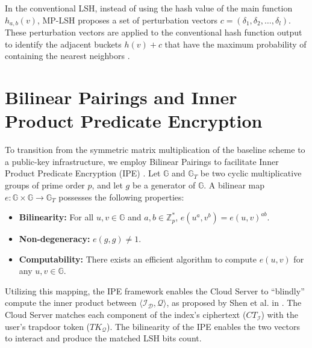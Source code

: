 In the conventional LSH, instead of using the hash value of the main function $h_{a, b}(v)$, MP-LSH proposes a set of perturbation vectors $c = (\delta_1, \delta_2, \dots, \delta_l)$. These perturbation vectors are applied to the conventional hash function output to identify the adjacent buckets $h(v) + c$ that have the maximum probability of containing the nearest neighbors \cite{lv2007multi}.

\section{Bilinear Pairings and Inner Product Predicate Encryption}
To transition from the symmetric matrix multiplication of the baseline scheme to a public-key infrastructure, we employ Bilinear Pairings to facilitate Inner Product Predicate Encryption (IPE) \cite{shen2009predicate}. Let $\mathbb{G}$ and $\mathbb{G}_T$ be two cyclic multiplicative groups of prime order $p$, and let $g$ be a generator of $\mathbb{G}$. A bilinear map $e: \mathbb{G} \times \mathbb{G} \rightarrow \mathbb{G}_T$ possesses the following properties:
\begin{itemize}
    \item \textbf{Bilinearity:} For all $u, v \in \mathbb{G}$ and $a, b \in \mathbb{Z}_p^*$, $e(u^a, v^b) = e(u, v)^{ab}$.
    \item \textbf{Non-degeneracy:} $e(g, g) \neq 1$.
    \item \textbf{Computability:} There exists an efficient algorithm to compute $e(u, v)$ for any $u, v \in \mathbb{G}$.
\end{itemize}

Utilizing this mapping, the IPE framework enables the Cloud Server to “blindly” compute the inner product between $\langle \mathcal{I_D}, \mathcal{Q} \rangle$, as proposed by Shen et al. in \cite{shen2009predicate}. The Cloud Server matches each component of the index's ciphertext ($CT_{\mathcal{I}}$) with the user's trapdoor token ($TK_{\mathcal{Q}}$). The bilinearity of the IPE enables the two vectors to interact and produce the matched LSH bits count.